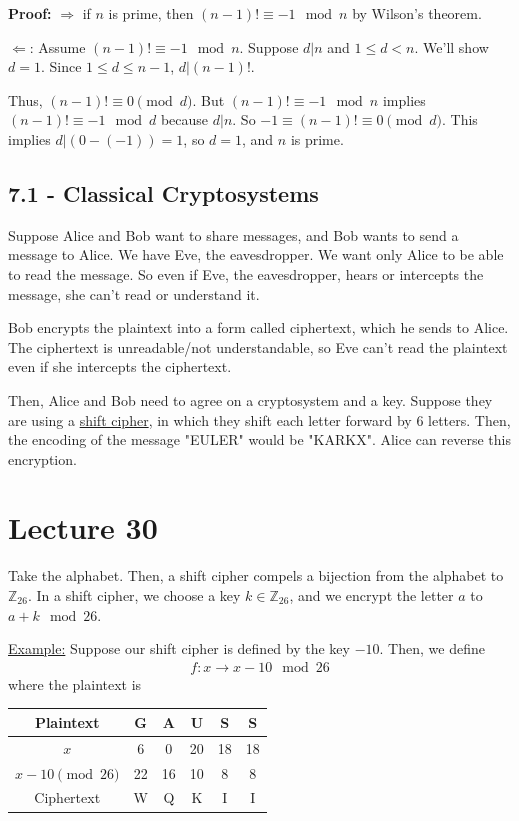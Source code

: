 \documentclass{article}
\newcommand*{\zz}{\mathbb{Z}}%
\begin{document}
\textbf{Proof:} $\Rightarrow$ if $n$ is prime, then $(n-1)!\equiv -1\mod n$ by Wilson's theorem.

$\Leftarrow$: Assume $(n-1)!\equiv -1\mod n$. Suppose $d|n$ and $1\leq d<n$. We'll show $d=1$. Since $1\leq d\leq n-1$, $d|(n-1)!$. 

Thus, $(n-1)!\equiv 0\pmod d$. But $(n-1)!\equiv -1\mod n$ implies $(n-1)!\equiv -1\mod d$ because $d|n$. So $-1\equiv (n-1)!\equiv 0\pmod d$. This implies $d|(0-(-1))=1$, so $d=1$, and $n$ is prime. 

\subsection{7.1 - Classical Cryptosystems}

Suppose Alice and Bob want to share messages, and Bob wants to send a message to Alice. We have Eve, the eavesdropper. We want only Alice to be able to read the message. So even if Eve, the eavesdropper, hears or intercepts the message, she can't read or understand it.

Bob encrypts the plaintext into a form called ciphertext, which he sends to Alice. The ciphertext is unreadable/not understandable, so Eve can't read the plaintext even if she intercepts the ciphertext. 

Then, Alice and Bob need to agree on a cryptosystem and a key. Suppose they are using a \underline{shift cipher}, in which they shift each letter forward by 6 letters. Then, the encoding of the message "EULER" would be "KARKX". Alice can reverse this encryption. 

\section{Lecture 30}

Take the alphabet. Then, a shift cipher compels a bijection from the alphabet to $\zz_{26}$. In a shift cipher, we choose a key $k\in \zz_{26}$, and we encrypt the letter $a$ to $a+k\mod 26$.

\underline{Example:} Suppose our shift cipher is defined by the key $-10$. Then, we define \begin{align*}
    f: x\to x-10\mod 26
\end{align*}where the plaintext is \begin{center}
    \begin{tabular}{c|c|c|c|c|c}
        Plaintext & G & A & U & S & S\\
        \hline
        $x$ & 6 & 0 & 20 & 18 & 18\\
        $x-10\pmod{26}$ & 22 & 16 & 10 & 8 & 8\\
        \hline
        Ciphertext & W & Q & K & I & I
    \end{tabular}
\end{center}
\end{document}
